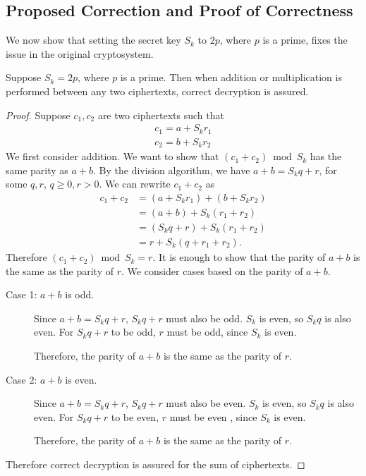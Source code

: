 \subsection{Proposed Correction and Proof of Correctness}
We now show that setting the secret key $S_k$ to $2p$, where $p$ is a prime, fixes the issue in the original cryptosystem.
\begin{theorem}
	Suppose $S_k = 2p$, where $p$ is a prime. Then when addition or multiplication is performed between any two ciphertexts, correct decryption is assured.
\end{theorem}
\begin{proof}
	Suppose $c_1, c_2$ are two ciphertexts such that
	\begin{align*}
		c_1 = a + S_kr_1\\
		c_2 = b + S_kr_2
	\end{align*}
	We first consider addition. We want to show that $(c_1+c_2)\bmod S_k$ has the same parity as $a+b$.
	By the division algorithm, we have $a+b = S_kq + r$, for some $q,r$, $q \geq 0, r > 0$. We can rewrite $c_1+c_2$ as
	\begin{align*}
		c_1+c_2 &= (a + S_kr_1) + (b + S_kr_2)\\
		&= (a+b)+ S_k(r_1 + r_2)\\
		&= (S_kq + r) + S_k(r_1 + r_2)\\
		&= r + S_k(q + r_1 + r_2).
	\end{align*}
	Therefore $(c_1+c_2)\bmod S_k = r$.
	It is enough to show that the parity of $a+b$ is the same as the parity of $r$. We consider cases based on the parity of $a+b$.
	\begin{description}
		\item[Case 1: $a+b$ is odd.]
			Since $a+b = S_kq + r$, $S_kq + r$ must also be odd.
			$S_k$ is even, so $S_kq$ is also even.
			For $S_kq + r$ to be odd, $r$ must be odd, since $S_k$ is even.

			Therefore, the parity of $a+b$ is the same as the parity of $r$.
		\item[Case 2: $a+b$ is even.]
			Since $a+b = S_kq + r$, $S_kq + r$ must also be even.
			$S_k$ is even, so $S_kq$ is also even. For $S_kq + r$ to be even, $r$ must be even , since $S_k$ is even.

			Therefore, the parity of $a+b$ is the same as the parity of $r$.
	\end{description}
	Therefore correct decryption is assured for the sum of ciphertexts.


\end{proof}
